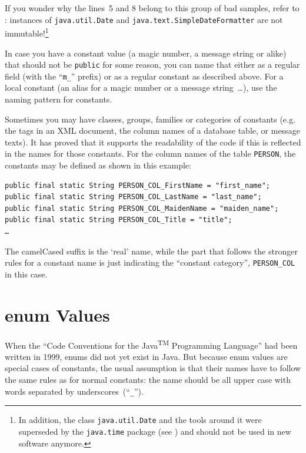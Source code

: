 \documentclass[11pt,a4paper, titlepage, parskip=half, headsepline, footsepline, cleardoublepage=current, headheight=1cm]{scrbook}
\begin{document}
If you wonder why the lines~5 and 8 belong to this group of bad samples, refer to \autocite{ORACLE_DOC_DATE_CLASS,ORACLE_DOC_SIMPLEDATEFORMATTER_CLASS}: instances of \lstinline|java.util.Date| and \lstinline|java.text.SimpleDateFormatter| are not immutable!\footnote{In addition, the class \lstinline|java.util.Date| and the tools around it were superseded by the \lstinline|java.time| package (see \autocite{ORACLE_DOC_TIME_PACKAGE}) and should not be used in new software anymore.}

In case you have a constant value (a magic number, a message string or alike) that should not be \lstinline|public| for some reason, you can name that either as a regular field (with the “\verb#m_#” prefix) or as a regular constant as described above. For a local constant (an alias for a magic number or a message string~…), use the naming pattern for constants. 

Sometimes you may have classes, groups, families or categories of constants (e.g. the tags in an XML document, the column names of a database table, or message texts). It has proved that it supports the readability of the code if this is reflected in the names for those constants. For the column names of the table \verb#PERSON#, the constants may be defined as shown in this example:
\begin{lstlisting}
public final static String PERSON_COL_FirstName = "first_name";
public final static String PERSON_COL_LastName = "last_name";
public final static String PERSON_COL_MaidenName = "maiden_name";
public final static String PERSON_COL_Title = "title";
…
\end{lstlisting}
The camelCased suffix is the ‘real’ name, while the part that follows the stronger rules for a constant name is just indicating the “constant category”, \verb#PERSON_COL# in this case.


\section{enum Values}\label{sec:EnumValues}
When the “Code Conventions for the Java\textsuperscript{TM} Programming Language”\autocite{SUN_CODE_CONVENTIONS} had been written in 1999, enums did not yet exist in Java. But because enum values are special cases of constants, the usual assumption is that their names have to follow the same rules as for normal constants: the name should be all upper case with words separated by underscores~(“\verb#_#”).
\end{document}
